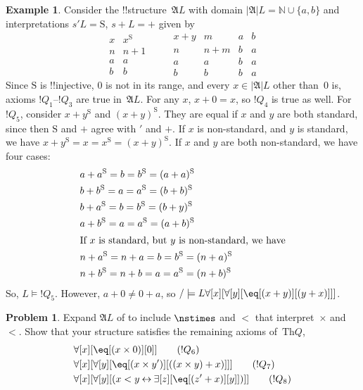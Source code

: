\documentclass[10pt,a4paper]{article}
\makeatletter
\theoremstyle{plain}
\theoremstyle{definition}
\newtheorem{ex}[thm]{Example}
\newtheorem{prob}{Problem}[section]
\theoremstyle{remark}
\newcommand*{\ollabel}[1]{\label{#1}}
\newcommand{\olref}{\@ifnextchar[{\olref@i}{\olref@final}}
\def\olref@i[#1]{\@ifnextchar[{\olref@ii}{\olref@final}}
\def\olref@ii[#1]{\@ifnextchar[{\olref@iii}{\olref@final}}
\def\olref@iii[#1]{\olref@final}
\def\olref@final#1{\ref{#1}}
\providecommand{\lforall}{\mathord{\forall}}
\providecommand{\lexists}{\mathord{\exists}}
\providecommand{\Obj}{}
\providecommand{\Struct}{\ensuremath{\mathfrak{A}}}
\providecommand{\Domain}{\ensuremath{|\mathfrak{A}|}}
\providecommand{\Assign}{\ensuremath{s}}
\providecommand{\Sat}[2]{\ensuremath{#1 \models #2}}
\providecommand{\Th}{\ensuremath{\mathrm{Th}}}
\providecommand{\Nat}{\ensuremath{\mathbb{N}}}
\providecommand{\liff}{\mathbin{\leftrightarrow}}
\providecommand{\nssucc}{\mathrm{S}}
\providecommand{\nsplus}{\mathbin{+}}
\providecommand{\nsless}{<}
\makeatother
\begin{document}
\begin{ex}
\ollabel{ex:model-L-of-Q} Consider the !!{structure}~$\Struct{L}$ with
domain $\Domain{L} = \Nat \cup \{a, b\}$ and interpretations
$\Assign{\prime}{L} = \nssucc$, $\Assign{+}{L} = \nsplus$ given by
\[
\begin{array}{c|c}
  x & x^\nssucc \\
  \hline
  n & n+1 \\
  a & a\\
  b & b
\end{array}
\qquad
\begin{array}{c|ccc}
  x \nsplus y & m & a & b\\
  \hline
  n & n+m & b & a\\
  a & a & b & a\\
  b & b & b & a
\end{array}
\]
Since $\nssucc$ is !!{injective}, $0$ is not in its range, and every
$x \in \Domain{L}$ other than~$0$ is, axioms $!Q_1$--$!Q_3$ are true
in~$\Struct{L}$. For any $x$, $x \nsplus 0 = x$, so $!Q_4$ is true as
well.  For $!Q_5$, consider $x \nsplus y^\nssucc$ and $(x \nsplus
y)^\nssucc$. They are equal if $x$ and $y$ are both standard, since
then $\nssucc$ and $\nsplus$ agree with $\prime$ and $+$. If $x$ is
non-standard, and $y$ is standard, we have $x \nsplus y^\nssucc = x =
x^\nssucc = (x \nsplus y)^\nssucc$. If $x$ and $y$ are both
non-standard, we have four cases:
\begin{align*}
&  a \nsplus a^\nssucc  = b = b^\nssucc = (a \nsplus a)^\nssucc\\
&  b \nsplus b^\nssucc  = a = a^\nssucc = (b \nsplus b)^\nssucc\\
&  b \nsplus a^\nssucc  = b = b^\nssucc = (b \nsplus y)^\nssucc\\
&  a \nsplus b^\nssucc  = a = a^\nssucc = (a \nsplus b)^\nssucc\\
\intertext{If $x$ is standard, but $y$ is non-standard, we have}
&  n \nsplus a^\nssucc  = n \nsplus a = b = b^\nssucc = (n \nsplus a)^\nssucc\\
&  n \nsplus b^\nssucc  = n \nsplus b = a = a^\nssucc = (n \nsplus b)^\nssucc
\end{align*}
So, $\Sat{L}{!Q_5}$. However, $a \nsplus 0 \neq 0 \nsplus a$, so
$\Sat/{L}{\lforall[x][\lforall[y][\eq[(x+y)][(y+x)]]]}$.
\end{ex}

\begin{prob}
Expand $\Struct{L}$ of \olref[mod][mar][mdq]{ex:model-L-of-Q} to
include $\nstimes$ and $\nsless$ that interpret~$\times$ and $<$. Show
that your structure satisfies the remaining axioms of~$\Th{Q}$,
\begin{align*}
& \lforall[x][\eq[(x \times \Obj 0)][\Obj 0]] \tag{$!Q_6$}\\ &
  \lforall[x][\lforall[y][\eq[(x \times y')][((x \times y) + x)]]]
  \tag{$!Q_7$}\\ & \lforall[x][\lforall[y][(x < y \liff \lexists[z][\eq[(z'+x)][y]])]] \tag{$!Q_8$}
\end{align*}
\end{prob}
\end{document}
